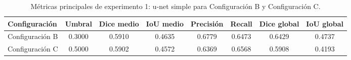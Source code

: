 \begin{table}[H]
    \centering
    \small
    \caption{Métricas principales de experimento 1: u-net simple para Configuración B y Configuración C.}
    \label{tab:experimento01unetsimple_metricas_principales}
    \begin{tabular}{lccccccc}
        \toprule
        Configuración & Umbral & Dice medio & IoU medio & Precisión & Recall & Dice global & IoU global \\
        \midrule
        Configuración B & 0.3000 & 0.5910 & 0.4635 & 0.6779 & 0.6473 & 0.6429 & 0.4737 \\
        Configuración C & 0.5000 & 0.5902 & 0.4572 & 0.6369 & 0.6568 & 0.5908 & 0.4193 \\
        \bottomrule
    \end{tabular}
\end{table}
